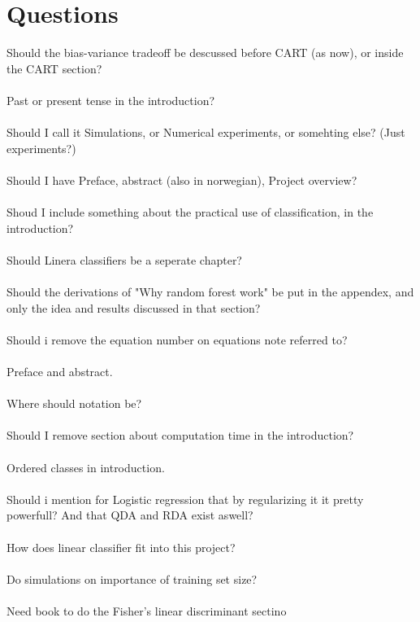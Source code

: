 \section{Questions}
\label{sec:Questions}
Should the bias-variance tradeoff be descussed before CART (as now), or inside the CART section?\\
\\
Past or present tense in the introduction?\\
\\
Should I call it Simulations, or Numerical experiments, or somehting else? (Just experiments?)\\
\\
Should I have Preface, abstract (also in norwegian), Project overview?\\
\\
Shoud I include something about the practical use of classification, in the introduction?\\
\\
Should Linera classifiers be a seperate chapter? \\
\\
Should the derivations of "Why random forest work" be put in the appendex, and only the idea and results discussed in that section?\\
\\
Should i remove the equation number on equations note referred to?\\
\\
Preface and abstract.\\
\\
Where should notation be? \\
\\
Should I remove section about computation time in the introduction? \\
\\
Ordered classes in introduction.\\
\\
Should i mention for Logistic regression that by regularizing it it pretty powerfull? And that QDA and RDA exist aswell?\\
\\
How does linear classifier fit into this project?\\
\\
Do simulations on importance of training set size? \\
\\
Need book to do the Fisher's linear discriminant sectino\\
\\
